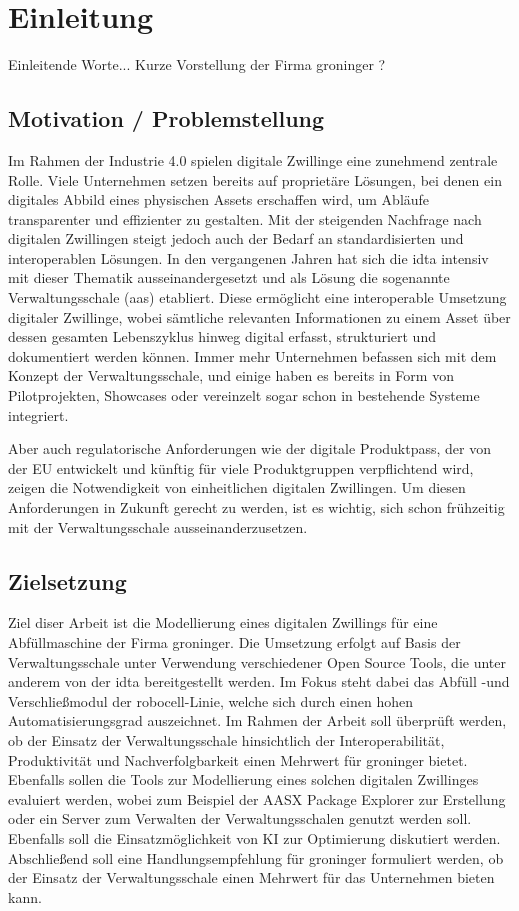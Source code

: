 \section{Einleitung}
Einleitende Worte...
Kurze Vorstellung der Firma groninger ?
\subsection{Motivation / Problemstellung}
\label{sec:Motivation}
Im Rahmen der Industrie 4.0 spielen digitale Zwillinge eine zunehmend zentrale Rolle. 
Viele Unternehmen setzen bereits auf proprietäre Lösungen, bei denen ein digitales Abbild eines physischen Assets erschaffen wird, um Abläufe transparenter und effizienter zu gestalten. 
Mit der steigenden Nachfrage nach digitalen Zwillingen steigt jedoch auch der Bedarf an standardisierten und interoperablen Lösungen.
In den vergangenen Jahren hat sich die \ac{idta} intensiv mit dieser Thematik ausseinandergesetzt und als Lösung die sogenannte Verwaltungsschale (\ac{aas}) etabliert.
Diese ermöglicht eine interoperable Umsetzung digitaler Zwillinge, wobei sämtliche relevanten Informationen zu einem Asset über dessen gesamten Lebenszyklus hinweg digital erfasst, strukturiert und dokumentiert werden können. 
Immer mehr Unternehmen befassen sich mit dem Konzept der Verwaltungsschale, und einige haben es bereits in Form von Pilotprojekten, Showcases oder vereinzelt sogar schon in bestehende Systeme integriert.

Aber auch regulatorische Anforderungen wie der digitale Produktpass, der von der EU entwickelt und künftig für viele Produktgruppen verpflichtend wird, zeigen die Notwendigkeit von einheitlichen digitalen Zwillingen. 
Um diesen Anforderungen in Zukunft gerecht zu werden, ist es wichtig, sich schon frühzeitig mit der Verwaltungsschale ausseinanderzusetzen.
\subsection{Zielsetzung}
Ziel diser Arbeit ist die Modellierung eines digitalen Zwillings für eine Abfüllmaschine der Firma groninger.
Die Umsetzung erfolgt auf Basis der Verwaltungsschale unter Verwendung verschiedener Open Source Tools, die unter anderem von der \acs{idta} bereitgestellt werden. 
Im Fokus steht dabei das Abfüll -und Verschließmodul der robocell-Linie, welche sich durch einen hohen Automatisierungsgrad auszeichnet.
Im Rahmen der Arbeit soll überprüft werden, ob der Einsatz der Verwaltungsschale hinsichtlich der Interoperabilität, Produktivität und Nachverfolgbarkeit einen Mehrwert für groninger bietet.
Ebenfalls sollen die Tools zur Modellierung eines solchen digitalen Zwillinges evaluiert werden, wobei zum Beispiel der AASX Package Explorer zur Erstellung oder ein Server zum Verwalten der Verwaltungsschalen genutzt werden soll.
Ebenfalls soll die Einsatzmöglichkeit von KI zur Optimierung diskutiert werden.
Abschließend soll eine Handlungsempfehlung für groninger formuliert werden, ob der Einsatz der Verwaltungsschale einen Mehrwert für das Unternehmen bieten kann.
